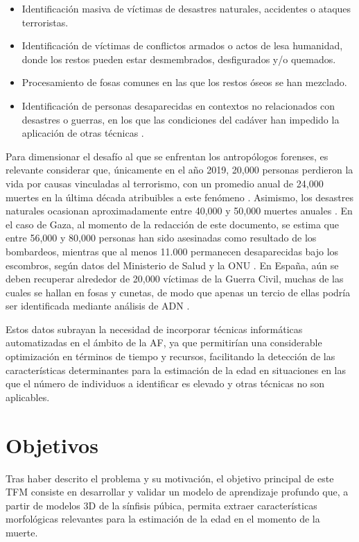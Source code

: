 \begin{itemize}
    \item Identificación masiva de víctimas de desastres naturales, accidentes o ataques terroristas.
    \item Identificación de víctimas de conflictos armados o actos de lesa humanidad, donde los restos pueden estar desmembrados, desfigurados y/o quemados.
    \item Procesamiento de fosas comunes en las que los restos óseos se han mezclado.
    \item Identificación de personas desaparecidas en contextos no relacionados con desastres o guerras, en los que las condiciones del cadáver han impedido la aplicación de otras técnicas \cite{byers_introduction_2016}.
\end{itemize}

Para dimensionar el desafío al que se enfrentan los antropólogos forenses, es relevante considerar que, únicamente en el año 2019, 20,000 personas perdieron la vida por causas vinculadas al terrorismo, con un promedio anual de 24,000 muertes en la última década atribuibles a este fenómeno \cite{owid_terrorism}. Asimismo, los desastres naturales ocasionan aproximadamente entre 40,000 y 50,000 muertes anuales \cite{owid_natural_disasters}. En el caso de Gaza, al momento de la redacción de este documento, se estima que entre 56,000 y 80,000 personas han sido asesinadas como resultado de los bombardeos, mientras que al menos 11.000 permanecen desaparecidas bajo los escombros, según datos del Ministerio de Salud y la ONU \cite{morales_56000_2025}. En España, aún se deben recuperar alrededor de 20,000 víctimas de la Guerra Civil, muchas de las cuales se hallan en fosas y cunetas, de modo que apenas un tercio de ellas podría ser identificada mediante análisis de ADN \cite{junquera_huellas_2022}.

Estos datos subrayan la necesidad de incorporar técnicas informáticas automatizadas en el ámbito de la AF, ya que permitirían una considerable optimización en términos de tiempo y recursos, facilitando la detección de las características determinantes para la estimación de la edad en situaciones en las que el número de individuos a identificar es elevado y otras técnicas no son aplicables.

\section{Objetivos}

Tras haber descrito el problema y su motivación, el objetivo principal de este TFM consiste en desarrollar y validar un modelo de aprendizaje profundo que, a partir de modelos 3D de la sínfisis púbica, permita extraer características morfológicas relevantes para la estimación de la edad en el momento de la muerte.

